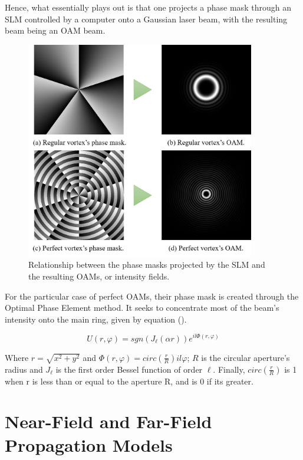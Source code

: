 \newpage
Hence, what essentially plays out is that one projects a phase mask through an SLM controlled by a computer onto a Gaussian laser beam, with the resulting beam being an OAM beam.

\begin{figure}[htbp]
    \centering
    \includegraphics[width=10cm]{images/c02/OAM/PhaseMasks_to_OAM.png}
    \caption{Relationship between the phase masks projected by the SLM and the resulting OAMs, or intensity fields.}
    \label{fig:PM2OAM}
\end{figure}

For the particular case of perfect OAMs, their phase mask is created through the Optimal Phase Element method. It seeks to concentrate most of the beam's intensity onto the main ring, given by equation ().

\begin{equation}
    U(r,\varphi) = sgn(J_\ell(\alpha r))e^{il\Phi(r,\varphi)}
\end{equation}

Where $r = \sqrt{x^2 + y^2}$ and $\Phi(r,\varphi) = circ \left( \frac{r}{R} \right) il\varphi$; $R$ is the circular aperture's radius and $J_\ell$ is the first order Bessel function of order $\ell$. Finally, $circ \left( \frac{r}{R} \right)$ is 1 when r is less than or equal to the aperture R, and is 0 if its greater.


\newpage
\section{Near-Field and Far-Field Propagation Models}
\label{c2:Near and Far Field Propagation}

